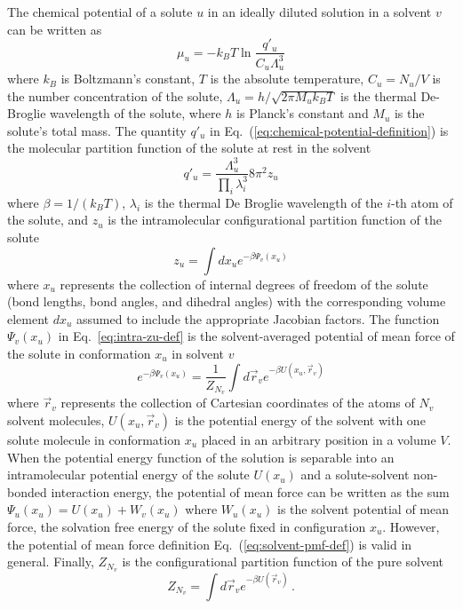 \documentclass[9pt,bestpractices,pubversion]{livecoms}
\begin{document}
The chemical potential of a solute $u$ in an ideally diluted solution in a solvent $v$ can be written as~\cite{guggenheim1952mixtures504,gilson1997statisticalthermodynamic,gilson2007calculation}
\begin{equation}
  \mu_u = -k_B T \ln \frac{q'_u}{C_u \Lambda_u^3}
  \label{eq:chemical-potential-definition}
\end{equation}
where $k_B$ is Boltzmann's constant, $T$ is the absolute temperature, $C_u = N_u/V$ is the number concentration of the solute, $\Lambda_u = h/\sqrt{2 \pi M_u k_B T}$ is the thermal De-Broglie wavelength of the solute, where $h$ is Planck's constant and $M_u$ is the solute's total mass. The quantity $q'_u$ in Eq.~(\ref{eq:chemical-potential-definition}) is the molecular partition function of the solute at rest in the solvent
\begin{equation}
  q'_u = \frac{\Lambda_u^3}{\prod_i \lambda_i^3} 8 \pi^2 z_u
  \label{eq:intra-qpu-def}
\end{equation}
where $\beta = 1/(k_B T)$, $\lambda_i$ is the thermal De Broglie wavelength of the $i$-th atom of the solute, and $z_u$ is the intramolecular configurational partition function of the solute
\begin{equation}
  z_u = \int dx_u e^{-\beta \Psi_v(x_u)}
  \label{eq:intra-zu-def}
\end{equation}
where $x_u$ represents the collection of internal degrees of freedom of the solute (bond lengths, bond angles, and dihedral angles) with the corresponding volume element $dx_u$ assumed to include the appropriate Jacobian factors. The function $\Psi_v(x_u)$ in Eq.~\ref{eq:intra-zu-def} is the solvent-averaged potential of mean force of the solute in conformation $x_u$ in solvent $v$\cite{rouxandsimonson1999solventmodels} 
\begin{equation}
  e^{-\beta \Psi_v(x_u)} = \frac{1}{Z_{N_v}} \int d\vec{r}_v e^{-\beta U(x_u, \vec{r}_v)}
  \label{eq:solvent-pmf-def}
\end{equation}
where $\vec{r}_v$ represents the collection of Cartesian coordinates of the atoms of $N_v$ solvent molecules, $U(x_u, \vec{r}_v)$ is the potential energy of the solvent with one solute molecule in conformation $x_u$ placed in an arbitrary position in a volume $V$. When the potential energy function of the solution is separable into an intramolecular potential energy of the solute $U(x_u)$ and a solute-solvent non-bonded interaction energy, the potential of mean force can be written as the sum $\Psi_u(x_u) = U(x_u) + W_v(x_u)$ where $W_u(x_u)$ is the solvent potential of mean force, the solvation free energy of the solute fixed in configuration $x_u$.\cite{gilson2007calculation} However, the potential of mean force definition Eq.~(\ref{eq:solvent-pmf-def}) is valid in general. Finally, $Z_{N_v}$ is the configurational partition function of the pure solvent
\begin{equation}
  Z_{N_v} = \int d\vec{r}_v e^{-\beta U(\vec{r}_v)} \, .
  \label{eq:Z-pure-solvent}
\end{equation}
\end{document}
